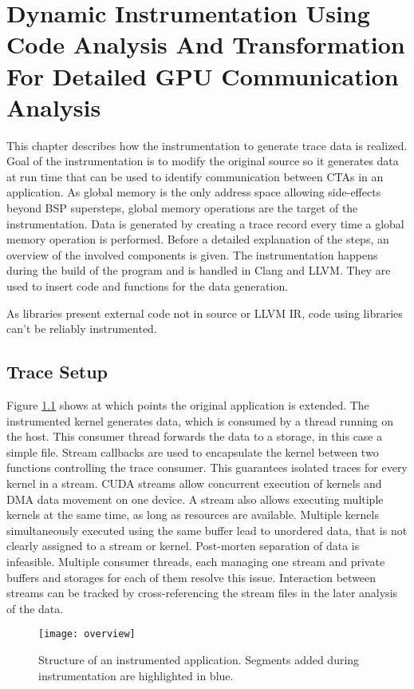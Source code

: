 \chapter{Dynamic Instrumentation Using Code Analysis And Transformation For Detailed GPU Communication Analysis}\label{chap:impl}
This chapter describes how the instrumentation to generate trace data is realized. Goal of the instrumentation is to modify the original source so it generates data at run time that can be used to identify communication between CTAs in an application. As global memory is the only address space allowing side-effects beyond BSP supersteps, global memory operations are the target of the instrumentation. Data is generated by creating a trace record every time a global memory operation is performed.  Before a detailed explanation of the steps, an overview of the involved components is given. The instrumentation happens during the build of the program and is handled in Clang and LLVM. They are used to insert code and functions for the data generation.



As libraries present external code not in source or LLVM IR, code using libraries can't be reliably instrumented.

\section{Trace Setup}
Figure \ref{overview} shows at which points the original application is extended. The instrumented kernel generates data, which is consumed by a thread running on the host. This consumer thread forwards the data to a 
storage, in this case a simple file. Stream callbacks are used to encapsulate the kernel
between two functions controlling the trace consumer. This guarantees isolated traces for every kernel in a stream.
CUDA streams allow concurrent execution of kernels and DMA data movement on one device.
A stream also allows executing multiple kernels at the same time, as long as resources are available. Multiple kernels simultaneously executed using the same buffer lead to unordered data, that is not clearly assigned to a stream or kernel. Post-morten separation of data is infeasible. Multiple consumer threads, each managing one stream and private buffers and storages for each of them resolve this issue. Interaction between streams can be tracked by cross-referencing the stream files in the later analysis of the data.
\begin{figure}[t]
	\centering
	\texttt{[image: overview]}
	\caption{Structure of an instrumented application. Segments added during instrumentation are highlighted in blue.}
	\label{overview}
\end{figure}


